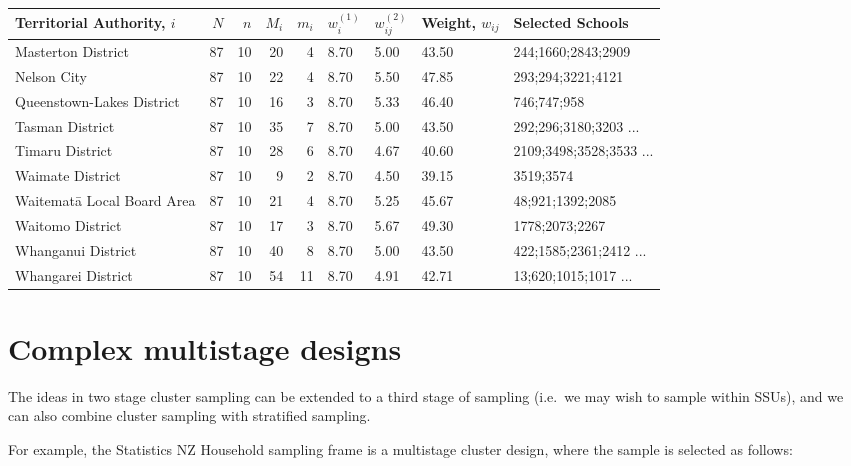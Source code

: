 \documentclass[
]{book}
\begin{document}
\begin{table}
\centering
\begin{tabular}[t]{l|r|r|r|r|l|l|l|l}
\hline
Territorial Authority, $i$ & $N$ & $n$ & $M_i$ & $m_i$ & $w^{(1)}_i$ & $w^{(2)}_{ij}$ & Weight, $w_{ij}$ & Selected Schools\\
\hline
Masterton District & 87 & 10 & 20 & 4 & 8.70 & 5.00 & 43.50 & 244;1660;2843;2909\\
\hline
Nelson City & 87 & 10 & 22 & 4 & 8.70 & 5.50 & 47.85 & 293;294;3221;4121\\
\hline
Queenstown-Lakes District & 87 & 10 & 16 & 3 & 8.70 & 5.33 & 46.40 & 746;747;958\\
\hline
Tasman District & 87 & 10 & 35 & 7 & 8.70 & 5.00 & 43.50 & 292;296;3180;3203 ...\\
\hline
Timaru District & 87 & 10 & 28 & 6 & 8.70 & 4.67 & 40.60 & 2109;3498;3528;3533 ...\\
\hline
Waimate District & 87 & 10 & 9 & 2 & 8.70 & 4.50 & 39.15 & 3519;3574\\
\hline
Waitematā Local Board Area & 87 & 10 & 21 & 4 & 8.70 & 5.25 & 45.67 & 48;921;1392;2085\\
\hline
Waitomo District & 87 & 10 & 17 & 3 & 8.70 & 5.67 & 49.30 & 1778;2073;2267\\
\hline
Whanganui District & 87 & 10 & 40 & 8 & 8.70 & 5.00 & 43.50 & 422;1585;2361;2412 ...\\
\hline
Whangarei District & 87 & 10 & 54 & 11 & 8.70 & 4.91 & 42.71 & 13;620;1015;1017 ...\\
\hline
\end{tabular}
\end{table}

\section{Complex multistage designs}\label{complex-multistage-designs}

The ideas in two stage cluster sampling can be extended to a third stage of sampling
(i.e.~we may wish to sample within SSUs), and we can also combine cluster sampling
with stratified sampling.

For example, the Statistics NZ Household sampling frame is a multistage cluster
design, where the sample is selected as follows:
\end{document}
